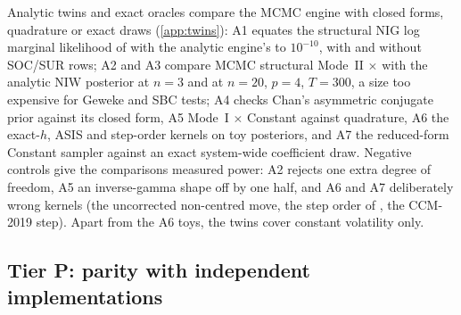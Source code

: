 Analytic twins and exact oracles compare the MCMC engine with closed forms, quadrature or exact
draws (\cref{app:twins}): A1 equates the structural NIG log marginal likelihood of
\citet{chan2022asymmetric} with the analytic engine's to $10^{-10}$, with and without SOC/SUR
rows; %
A2 and A3 compare MCMC structural Mode~II $\times$  with the analytic NIW
posterior at $n = 3$ and at $n = 20$, $p = 4$, $T = 300$, a size too expensive for Geweke and SBC
tests; %
A4 checks Chan's asymmetric conjugate prior against its closed form, A5 Mode~I $\times$
Constant against quadrature, A6
the exact-$h$, ASIS and step-order kernels on toy posteriors, and A7 the reduced-form Constant
sampler against an exact system-wide coefficient draw. %
Negative controls give the comparisons measured power: A2 rejects one extra degree of freedom, A5
an inverse-gamma shape off by one half, and A6 and A7 deliberately wrong kernels (the uncorrected
non-centred move, the step order of \citealp{primiceri2005time}, the CCM-2019 step). %
Apart from the A6 toys, the twins cover constant volatility only.

\subsection{Tier P: parity with independent implementations}\label{sec:validation-parity}

